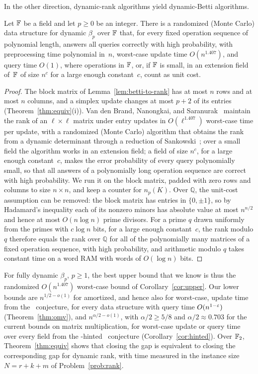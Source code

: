 In the other direction, dynamic-rank algorithms yield dynamic-Betti algorithms.

\begin{corollary}\label{cor:upper}
Let $\mathbb{F}$ be a field and let $p\ge0$ be an integer.
There is a randomized (Monte Carlo) data structure for dynamic $\beta_p$ over $\mathbb{F}$ that, for every fixed operation sequence of polynomial length, answers all queries correctly with high probability, with preprocessing time polynomial in~$n$, worst-case update time $O(n^{1.407})$, and query time $O(1)$, where operations in $\mathbb{F}$, or, if $\mathbb{F}$ is small, in an extension field of~$\mathbb{F}$ of size $n^{c}$ for a large enough constant~$c$, count as unit cost.
\end{corollary}

\begin{proof}
The block matrix of Lemma~\ref{lem:betti-to-rank} has at most $n$ rows and at most $n$ columns, and a simplex update changes at most $p+2$ of its entries (Theorem~\ref{thm:equiv}(i)).
Van den Brand, Nanongkai, and Saranurak~\cite{vdBNS19} maintain the rank of an $\ell\times\ell$ matrix under entry updates in $O(\ell^{1.407})$ worst-case time per update, with a randomized (Monte Carlo) algorithm that obtains the rank from a dynamic determinant through a reduction of Sankowski~\cite{San07}; over a small field the algorithm works in an extension field; a field of size $n^{c}$, for a large enough constant~$c$, makes the error probability of every query polynomially small, so that all answers of a polynomially long operation sequence are correct with high probability.
We run it on the block matrix, padded with zero rows and columns to size $n\times n$, and keep a counter for $n_p(K)$.
Over $\mathbb{Q}$, the unit-cost assumption can be removed: the block matrix has entries in $\{0,\pm1\}$, so by Hadamard's inequality each of its nonzero minors has absolute value at most $n^{n/2}$ and hence at most $O(n\log n)$ prime divisors.
For a prime $q$ drawn uniformly from the primes with $c\log n$ bits, for a large enough constant~$c$, the rank modulo $q$ therefore equals the rank over $\mathbb{Q}$ for all of the polynomially many matrices of a fixed operation sequence, with high probability, and arithmetic modulo $q$ takes constant time on a word RAM with words of $O(\log n)$ bits.
\end{proof}

For fully dynamic $\beta_p$, $p\ge1$, the best upper bound that we know is thus the randomized $O(n^{1.407})$ worst-case bound of Corollary~\ref{cor:upper}.
Our lower bounds are $n^{1/2-o(1)}$ for amortized, and hence also for worst-case, update time from the \OMv\ conjecture, for every data structure with query time $O(n^{1-\varepsilon})$ (Theorem~\ref{thm:omv}), and $n^{\alpha/2-o(1)}$, with $\alpha/2\ge5/8$ and $\alpha/2\approx0.703$ for the current bounds on matrix multiplication, for worst-case update or query time over every field from the \uMv-hinted \uMv\ conjecture (Corollary~\ref{cor:hinted}).
Over $\mathbb{F}_2$, Theorem~\ref{thm:equiv} shows that closing the gap is equivalent to closing the corresponding gap for dynamic rank, with time measured in the instance size $N=r+k+m$ of Problem~\ref{prob:rank}.

